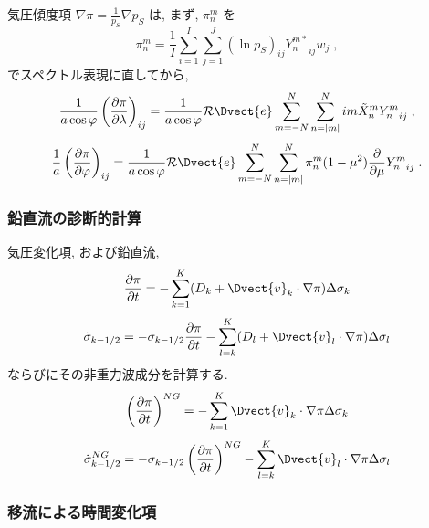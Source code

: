 気圧傾度項 $\nabla \pi = \frac{1}{p_S} \nabla p_S$ は,
まず, $\pi_n^m$ を
\begin{equation}
  \pi_n^m  =  \frac{1}{I} \sum_{i=1}^{I} \sum_{j=1}^{J}  
               (\ln {p_S})_{ij} {Y_n^{m *}}_{ij}  w_j \; ,
\end{equation}
でスペクトル表現に直してから,
\begin{equation}
   \frac{1}{a \cos \varphi} 
   \left( \frac{\partial \pi}{\partial \lambda} \right)_{ij}
     = 
   \frac{1}{a \cos \varphi} 
        {\cal R}\Dvect{e} \sum_{m=-N}^{N} \sum_{n=|m|}^{N} 
       im \tilde{X}_n^m {Y_n^m}_{ij}  \; ,
\end{equation}
\begin{equation}
   \frac{1}{a}
   \left( \frac{\partial \pi}{\partial \varphi} \right)_{ij}
     =  
   \frac{1}{a \cos \varphi} 
       {\cal R}\Dvect{e} \sum_{m=-N}^{N} \sum_{n=|m|}^{N} 
       \pi_n^m 
       ( 1-\mu^{2} ) \frac{\partial }{\partial \mu} {Y_n^m}_{ij}  \; .
\end{equation}

\subsubsection{鉛直流の診断的計算}

気圧変化項, および鉛直流,
\begin{equation}
  \frac{\partial \pi}{\partial t}
 = - \sum_{k=1}^{K} ( D_k + \Dvect{v}_k \cdot \nabla \pi ) 
       \Delta  \sigma_k
\end{equation}
%
\begin{equation}
  \dot{\sigma}_{k-1/2}
 = - \sigma_{k-1/2} \frac{\partial \pi}{\partial t}
   - \sum_{l=k}^{K} ( D_l + \Dvect{v}_l \cdot \nabla \pi )          
       \Delta  \sigma_l
\end{equation}
%
ならびにその非重力波成分を計算する.
%
\begin{equation}
  \left( \frac{\partial \pi}{\partial t} \right)^{NG}
   =   - \sum_{k=1}^{K} \Dvect{v}_{k} \cdot \nabla \pi  
       \Delta  \sigma_{k} \nonumber \\
\end{equation}
%
\begin{equation}
  \dot{\sigma}^{NG}_{k-1/2}
 = - \sigma_{k-1/2} \left( \frac{\partial \pi}{\partial t} \right)^{NG}
   - \sum_{l=k}^{K} \Dvect{v}_{l} \cdot \nabla \pi
       \Delta  \sigma_{l}
\end{equation}

\subsubsection{移流による時間変化項}

